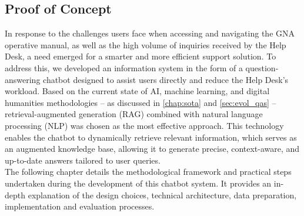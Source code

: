 \begin{spacing}{1.5}
\section{Proof of Concept}
In response to the challenges users face when accessing and navigating the GNA operative manual, as well as the high volume of inquiries received by the Help Desk, a need emerged for a smarter and more efficient support solution. To address this, we developed an information system in the form of a question-answering chatbot designed to assist users directly and reduce the Help Desk’s workload. Based on the current state of AI, machine learning, and digital humanities methodologies -- as discussed in \autoref{chap:sota} and \autoref{sec:evol_qas} -- retrieval-augmented generation (RAG) combined with natural language processing (NLP) was chosen as the most effective approach. This technology enables the chatbot to dynamically retrieve relevant information, which serves as an augmented knowledge base, allowing it to generate precise, context-aware, and up-to-date answers tailored to user queries.
\\

The following chapter details the methodological framework and practical steps undertaken during the development of this chatbot system. It provides an in-depth explanation of the design choices, technical architecture, data preparation, implementation and evaluation processes.


\end{spacing}